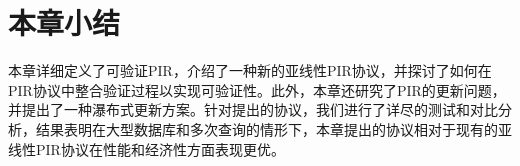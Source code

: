 \section{本章小结}

本章详细定义了可验证PIR，介绍了一种新的亚线性PIR协议，并探讨了如何在PIR协议中整合验证过程以实现可验证性。此外，本章还研究了PIR的更新问题，并提出了一种瀑布式更新方案。针对提出的协议，我们进行了详尽的测试和对比分析，结果表明在大型数据库和多次查询的情形下，本章提出的协议相对于现有的亚线性PIR协议在性能和经济性方面表现更优。